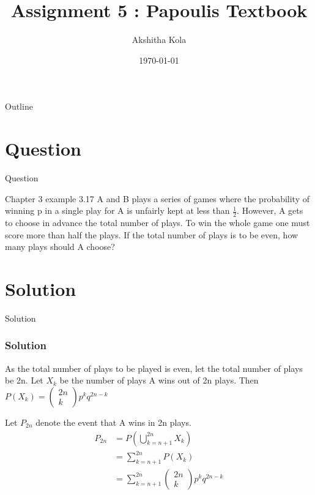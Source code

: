 \documentclass{beamer}
\title{Assignment 5 : Papoulis Textbook }
\author{Akshitha Kola}
\date{\today}
\begin{document}
\begin{frame}
    \titlepage 
\end{frame}

\logo{}

\begin{frame}{Outline}
    \tableofcontents
\end{frame}

\section{Question}
\begin{frame}{Question}
    \begin{block}{Chapter 3 example 3.17}
    A and B plays a series of games where the probability of winning p in a single play for A is unfairly kept at less than $\frac{1}{2}$. However, A gets to choose in advance the total number of plays. To win the whole game one must score more than half the plays. If the total number of plays is to be even, how many plays should A choose?
    \end{block}
\end{frame}

\section{Solution}
\begin{frame}{Solution}
\frametitle{Solution}
As the total number of plays to be played is even, let the total number of plays be 2n. Let $X_{k}$ be the number of plays A wins out of 2n plays.
Then $P(X_{k}) = \begin{pmatrix} 2n\\k\end{pmatrix} p^{k}q^{2n-k}$

Let $P_{2n}$ denote the event that A wins in 2n plays.
\begin{align}
P_{2n} &= P\left(\bigcup\limits_{k=n+1}^{2n} X_{k}\right) \\
&= \sum_{k=n+1}^{2n} P(X_{k})\\
&= \sum_{k=n+1}^{2n} \begin{pmatrix} 2n\\k\end{pmatrix} p^{k}q^{2n-k}
\end{align}
\end{frame}
\end{document}

